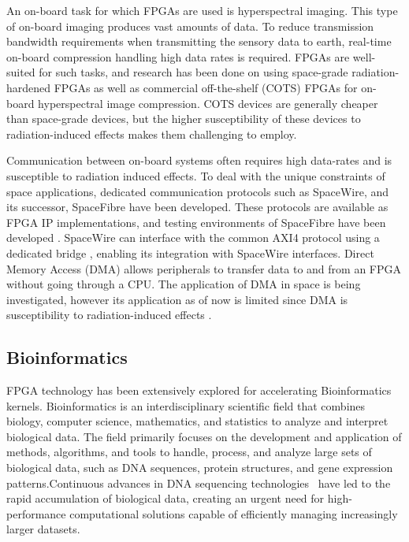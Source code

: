 An on-board task for which FPGAs are used is hyperspectral imaging. This type of on-board imaging produces vast amounts of data. To reduce transmission bandwidth requirements when transmitting the sensory data to earth, real-time on-board compression handling high data rates is required. FPGAs are well-suited for such tasks, and research has been done on using space-grade radiation-hardened FPGAs \cite{Barrios2020SHyLoCMissions} as well as commercial off-the-shelf (COTS) FPGAs \cite{Rodriguez2019ScalableCompression} for on-board hyperspectral image compression. COTS devices are generally cheaper than space-grade devices, but the higher susceptibility of these devices to radiation-induced effects makes them challenging to employ.

Communication between on-board systems often requires high data-rates and is susceptible to radiation induced effects. To deal with the unique constraints of space applications, dedicated communication protocols such as SpaceWire, and its successor, SpaceFibre have been developed. These protocols are available as FPGA IP implementations, and testing environments of SpaceFibre have been developed \cite{MystkowskaSimulationSpaceFibre, AnSection}. SpaceWire can interface with the common AXI4 protocol using a dedicated bridge \cite{RubattuASystems}, enabling its integration with SpaceWire interfaces. Direct Memory Access (DMA) allows peripherals to transfer data to and from an FPGA without going through a CPU. The application of DMA in space is being investigated, however its application as of now is limited since DMA is susceptibility to radiation-induced effects \cite{Portaluri2022Radiation-inducedDevices}.



\subsection{Bioinformatics}
\label{sec:bio}
FPGA technology has been extensively explored for accelerating Bioinformatics kernels. Bioinformatics is an interdisciplinary scientific field that combines biology, computer science, mathematics, and statistics to analyze and interpret biological data. The field primarily focuses on the development and application of methods, algorithms, and tools to handle, process, and analyze large sets of biological data, such as DNA sequences, protein structures, and gene expression patterns.Continuous advances in DNA sequencing technologies~\cite{hu2021next} have led to the rapid accumulation of biological data, creating an urgent need for high-performance computational solutions capable of efficiently managing increasingly larger datasets.

